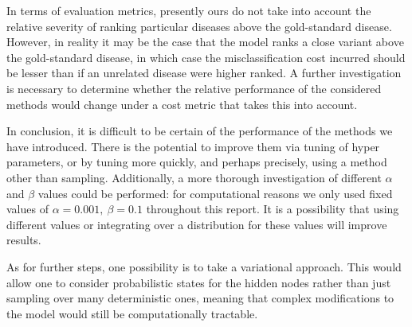 In terms of evaluation metrics, presently ours do not take into account the
relative severity of ranking particular diseases above the gold-standard disease.
%
However, in reality it may be the case that the model ranks a close variant
above the gold-standard disease, in which case the misclassification cost
incurred should be lesser than if an unrelated disease were higher ranked.
%
A further investigation is necessary to determine whether the relative
performance of the considered methods would change under a cost metric
that takes this into account.

In conclusion, it is difficult to be certain of the performance of the methods we have introduced. There is the potential to improve them via tuning of hyper parameters, or by tuning more quickly, and perhaps precisely, using a method other than sampling. Additionally, a more thorough investigation of different $\alpha$ and $\beta$ values could be performed: for computational reasons we only used fixed values of $\alpha=0.001,\ \beta=0.1$ throughout this report. It is a possibility that using different values or integrating over a distribution for these values will improve results. 

As for further steps, one possibility is to take a variational approach. This
would allow one to consider probabilistic states for the hidden nodes rather than just sampling
over many deterministic ones, meaning that complex modifications to the model would still be
computationally tractable. 

